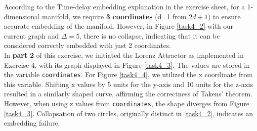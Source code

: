 According to the Time-delay embedding explanation in the exercise sheet, for a 1-dimensional manifold, we require \textbf{3 coordinates} (d=1 from $2d+1$) to ensure accurate embedding of the manifold. However, in Figure \ref{task4_2} with our current graph and $\Delta=5$, there is no collapse, indicating that it can be considered correctly embedded with just 2 coordinates. \\

In \textbf{part 2} of this exercise, we initiated the Lorenz Attractor as implemented in Exercise 4, with its graph displayed in Figure \ref{task4_3}. The values are stored in the variable \texttt{coordinates}. For Figure \ref{task4_4}, we utilized the x coordinate from this variable. Shifting x values by 5 units for the y-axis and 10 units for the z-axis resulted in a similarly shaped curve, affirming the correctness of Takens' theorem. However, when using z values from \texttt{coordinates}, the shape diverges from Figure \ref{task4_3}. Collapsation of two circles, originally distinct in \ref{task4_2}, indicates an embedding failure.


